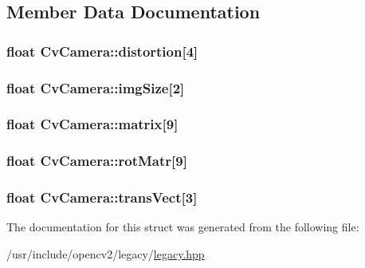 \subsection{Member Data Documentation}
\hypertarget{structCvCamera_a042d0f5498714b8ccbc42edb6dc6d3f4}{
\subsubsection[{distortion}]{\setlength{\rightskip}{0pt plus 5cm}float Cv\-Camera\-::distortion\mbox{[}4\mbox{]}}}\label{structCvCamera_a042d0f5498714b8ccbc42edb6dc6d3f4}
\hypertarget{structCvCamera_a9c640598804a3a64825e73b9456725a6}{
\subsubsection[{img\-Size}]{\setlength{\rightskip}{0pt plus 5cm}float Cv\-Camera\-::img\-Size\mbox{[}2\mbox{]}}}\label{structCvCamera_a9c640598804a3a64825e73b9456725a6}
\hypertarget{structCvCamera_a59f4e88cb77d0659b7721fdb221857e2}{
\subsubsection[{matrix}]{\setlength{\rightskip}{0pt plus 5cm}float Cv\-Camera\-::matrix\mbox{[}9\mbox{]}}}\label{structCvCamera_a59f4e88cb77d0659b7721fdb221857e2}
\hypertarget{structCvCamera_a2948313899fc0f26610cc228039240ec}{
\subsubsection[{rot\-Matr}]{\setlength{\rightskip}{0pt plus 5cm}float Cv\-Camera\-::rot\-Matr\mbox{[}9\mbox{]}}}\label{structCvCamera_a2948313899fc0f26610cc228039240ec}
\hypertarget{structCvCamera_ab4671992d1b78e26994418f1845727b4}{
\subsubsection[{trans\-Vect}]{\setlength{\rightskip}{0pt plus 5cm}float Cv\-Camera\-::trans\-Vect\mbox{[}3\mbox{]}}}\label{structCvCamera_ab4671992d1b78e26994418f1845727b4}


The documentation for this struct was generated from the following file\-:\begin{DoxyCompactItemize}
\item 
/usr/include/opencv2/legacy/\hyperlink{legacy_8hpp}{legacy.\-hpp}\end{DoxyCompactItemize}
